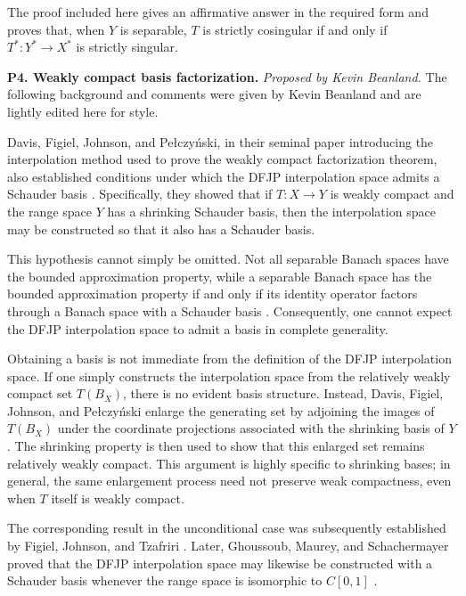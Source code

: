 \documentclass[11pt,reqno]{amsart}
\theoremstyle{plain}
\theoremstyle{definition}
\begin{document}
The proof included here gives an affirmative answer in the required form and proves that, when $Y$ is separable, $T$ is strictly cosingular if and only if $T^*:Y^*\to X^*$ is strictly singular. \medskip

\noindent\textbf{P4. Weakly compact basis factorization.} \emph{Proposed by Kevin Beanland.} The following background and comments were given by Kevin Beanland and are lightly edited here for style.

Davis, Figiel, Johnson, and Pe{\l}czy\'nski, in their seminal paper introducing the interpolation method used to prove the weakly compact factorization theorem, also established conditions under which the DFJP interpolation space admits a Schauder basis \cite{DavisFigielJohnsonPelczynski1974}. Specifically, they showed that if $T\colon X\to Y$ is weakly compact and the range space $Y$ has a shrinking Schauder basis, then the interpolation space may be constructed so that it also has a Schauder basis.

This hypothesis cannot simply be omitted. Not all separable Banach spaces have the bounded approximation property, while a separable Banach space has the bounded approximation property if and only if its identity operator factors through a Banach space with a Schauder basis \cite{Pelczynski1971}. Consequently, one cannot expect the DFJP interpolation space to admit a basis in complete generality.

Obtaining a basis is not immediate from the definition of the DFJP interpolation space. If one simply constructs the interpolation space from the relatively weakly compact set $T(B_X)$, there is no evident basis structure. Instead, Davis, Figiel, Johnson, and Pe{\l}czy\'nski enlarge the generating set by adjoining the images of $T(B_X)$ under the coordinate projections associated with the shrinking basis of $Y$. The shrinking property is then used to show that this enlarged set remains relatively weakly compact. This argument is highly specific to shrinking bases; in general, the same enlargement process need not preserve weak compactness, even when $T$ itself is weakly compact.

The corresponding result in the unconditional case was subsequently established by Figiel, Johnson, and Tzafriri \cite{FigielJohnsonTzafriri1975}. Later, Ghoussoub, Maurey, and Schachermayer proved that the DFJP interpolation space may likewise be constructed with a Schauder basis whenever the range space is isomorphic to $C[0,1]$ \cite{GhoussoubMaureySchachermayer1992}.
\end{document}
